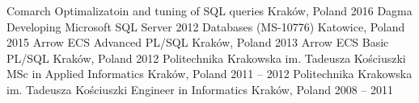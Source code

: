 

\begin{cventries}

   \cventry
	{Comarch}
	{Optimalizatoin and tuning of SQL queries}
	{Kraków, Poland}
	{2016}
	{}
  \cventry
  	{Dagma}
  	{Developing Microsoft SQL Server 2012 Databases (MS-10776)}
  	{Katowice, Poland}
  	{2015}
  	{}
  \cventry
  	{Arrow ECS}
  	{Advanced PL/SQL}
  	{Kraków, Poland}
  	{2013}
  	{}
  \cventry
	{Arrow ECS}
	{Basic PL/SQL}
	{Kraków, Poland}
	{2012}
	{}
  \cventry
  	{Politechnika Krakowska im. Tadeusza Kościuszki}
    {MSc in Applied Informatics} %
    {Kraków, Poland} %
    {2011 -- 2012} %
    {}
  \cventry
    {Politechnika Krakowska im. Tadeusza Kościuszki} %
    {Engineer in Informatics} %
    {Kraków, Poland} %
    {2008 -- 2011} %
    {}

\end{cventries}
